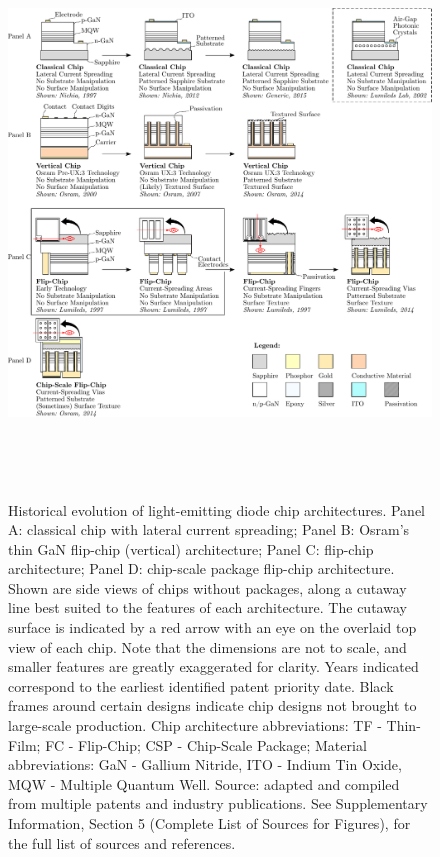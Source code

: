 \documentclass[journal=jacsat,manuscript=article]{achemso}
\begin{document}
\clearpage
\begin{figure}[h!]
 \centering
 \includegraphics[height=15cm]{2_SSL_EST/article/figures/chip_architecture_overview.pdf}
 \caption{Historical evolution of light-emitting diode chip architectures. Panel A: classical chip with lateral current spreading; Panel B: Osram’s thin GaN flip-chip (vertical) architecture; Panel C: flip-chip architecture; Panel D: chip-scale package flip-chip architecture. Shown are side views of chips without packages, along a cutaway line best suited to the features of each architecture. The cutaway surface is indicated by a red arrow with an eye on the overlaid top view of each chip. Note that the dimensions are not to scale, and smaller features are greatly exaggerated for clarity. Years indicated correspond to the earliest identified patent priority date. Black frames around certain designs indicate chip designs not brought to large-scale production. Chip architecture abbreviations: TF - Thin-Film; FC - Flip-Chip; CSP - Chip-Scale Package; Material abbreviations: GaN - Gallium Nitride, ITO - Indium Tin Oxide, MQW - Multiple Quantum Well. Source: adapted and compiled from multiple patents and industry publications. See Supplementary Information, Section 5 (Complete List of Sources for Figures), for the full list of sources and references.}
 \label{fgr:chip_architecture_overview}
\end{figure}
\end{document}
